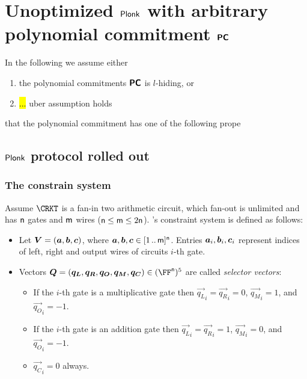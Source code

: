\documentclass[runningheads,11pt]{llncs}
\begin{document}
 \section{Unoptimized $\textnormal{\textsf{Plonk}}$ with arbitrary polynomial commitment $\bm{\mathsf{PC}}$}
 In the following we assume either
 \begin{enumerate}
 \item the polynomial commitments $\bm{\mathsf{PC}}$ is $l$-hiding, or 
 \item \hl{...} uber assumption holds 
 \end{enumerate}
 that the polynomial commitment has one of the
 following prope
 \subsection{$\textnormal{\textsf{Plonk}}$ protocol rolled out}
\label{sec:plonk_explained}
\newcommand{\vql}{\vec{q_{L}}}
\newcommand{\vqr}{\vec{q_{R}}}
\newcommand{\vqm}{\vec{q_{M}}}
\newcommand{\vqo}{\vec{q_{O}}}
\newcommand{\vx}{\vec{x}}
\newcommand{\vqc}{\vec{q_{C}}}
\subsubsection{The constrain system}
Assume $\CRKT$ is a fan-in two arithmetic circuit,
which fan-out is unlimited and has $\mathsf{n}$ gates and $\mathsf{m}$ wires
($\mathsf{n} \leq \mathsf{m} \leq 2\mathsf{n}$). \plonk's constraint
system is defined as follows:
\begin{itemize}
\item Let $\vec{V} = (\va, \vb, \vc)$, where $\va, \vb, \vc
  \in \range{1}{\noofw}^\numberofconstrains$. Entries $\va_i, \vb_i, \vc_i$ represent indices of left,
  right and output wires of circuits $i$-th gate.
\item Vectors $\vec{Q} = (\vql, \vqr, \vqo, \vqm, \vqc) \in
  (\FF^\numberofconstrains)^5$ are called \emph{selector vectors}:
  \begin{itemize}
  \item If the $i$-th gate is a multiplicative gate then $\vql_i = \vqr_i = 0$,
    $\vqm_i = 1$, and $\vqo_i = -1$. 
  \item If the $i$-th gate is an addition gate then $\vql_i = \vqr_i  = 1$, $\vqm_i =
    0$, and $\vqo_i = -1$. 
  \item $\vqc_i = 0$ always. 
  \end{itemize}
\end{itemize}
\end{document}
